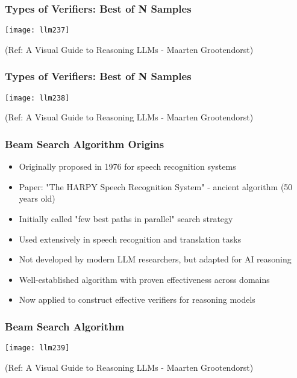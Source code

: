 \begin{frame}[fragile]\frametitle{Types of Verifiers: Best of N Samples}
	
		\begin{center}
        \texttt{[image: llm237]}
		
	
		{\tiny (Ref: A Visual Guide to Reasoning LLMs - Maarten Grootendorst)}
		
		\end{center}			
\end{frame}


\begin{frame}[fragile]\frametitle{Types of Verifiers: Best of N Samples}
	
		\begin{center}
	
        \texttt{[image: llm238]}
		
		{\tiny (Ref: A Visual Guide to Reasoning LLMs - Maarten Grootendorst)}
		
		\end{center}			
\end{frame}

\begin{frame}[fragile]\frametitle{Beam Search Algorithm Origins}
      \begin{itemize}
        \item Originally proposed in 1976 for speech recognition systems
        \item Paper: "The HARPY Speech Recognition System" - ancient algorithm (50 years old)
        \item Initially called "few best paths in parallel" search strategy
        \item Used extensively in speech recognition and translation tasks
        \item Not developed by modern LLM researchers, but adapted for AI reasoning
        \item Well-established algorithm with proven effectiveness across domains
        \item Now applied to construct effective verifiers for reasoning models
      \end{itemize}
\end{frame}

\begin{frame}[fragile]\frametitle{Beam Search Algorithm }
	
		\begin{center}
	
        \texttt{[image: llm239]}
		
		{\tiny (Ref: A Visual Guide to Reasoning LLMs - Maarten Grootendorst)}
		
		\end{center}			
\end{frame}


